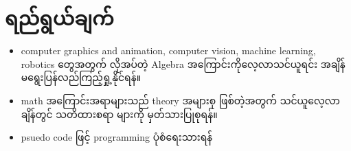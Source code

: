 \section*{ရည်ရွယ်ချက်}

\begin{itemize}
    \item computer graphics and animation, computer vision, machine learning, robotics တွေအတွက် လိုအပ်တဲ့ Algebra အကြောင်းကိုလေ့လာသင်ယူရင်း အချိန်မရွေးပြန်လည်ကြည့်ရှု့နိုင်ရန်။
    \item math အကြောင်းအရာများသည် theory အများစု ဖြစ်တဲ့အတွက် သင်ယူလေ့လာချိန်တွင် သတိထားစရာ များကို မှတ်သားပြုစုရန်။
    \item psuedo code ဖြင့် programming ပုံစံရေးသားရန်
\end{itemize}